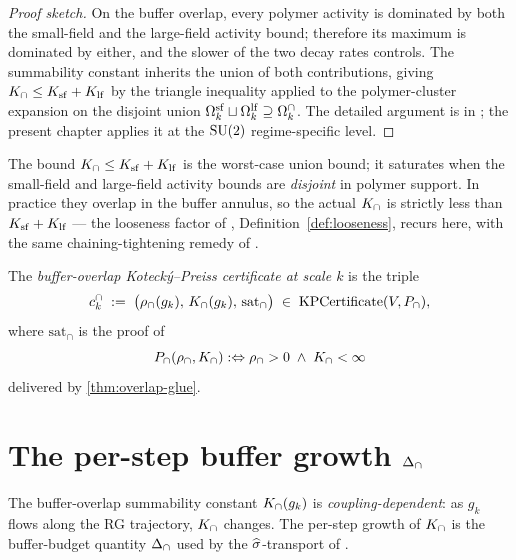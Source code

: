 \begin{proof}[Proof sketch]
On the buffer overlap, every polymer activity is dominated by both
the small-field and the large-field activity bound; therefore its
maximum is dominated by either, and the slower of the two decay
rates controls.  The summability constant inherits the union of
both contributions, giving $K_{\cap} \le K_{\mathrm{sf}} + K_{\mathrm{lf}}$ by the triangle
inequality applied to the polymer-cluster expansion on the
disjoint union $\Omega_k^{\mathrm{sf}} \sqcup \Omega_k^{\mathrm{lf}} \supseteq \Omega_k^{\cap}$.  The
detailed argument is in ; the present
chapter applies it at the $\mathrm{SU}(2)$ regime-specific level.
\end{proof}

\begin{remark}
\label{rem:K-cap-saturation}
The bound $K_{\cap} \le K_{\mathrm{sf}} + K_{\mathrm{lf}}$ is the worst-case union bound; it
saturates when the small-field and large-field activity bounds are
\emph{disjoint} in polymer support.  In practice they overlap in
the buffer annulus, so the actual $K_{\cap}$ is strictly less than
$K_{\mathrm{sf}} + K_{\mathrm{lf}}$ — the looseness factor of
, Definition~\ref{def:looseness}, recurs
here, with the same chaining-tightening remedy of
.
\end{remark}

\begin{definition}
\label{def:overlap-certificate}
The \emph{buffer-overlap Kotecký--Preiss certificate at scale $k$}
is the triple
\begin{equation}
  \label{eq:cap-certificate}
  c_k^{\cap} \;:=\;
  \bigl(\rho_{\cap}(g_k),\, K_{\cap}(g_k),\, \mathrm{sat}_{\cap}\bigr)
  \;\in\; \mathrm{KPCertificate}(V, P_{\cap}),
\end{equation}
where $\mathrm{sat}_{\cap}$ is the proof of
\[
  P_{\cap}(\rho_{\cap}, K_{\cap}) :\Leftrightarrow
  \rho_{\cap} > 0 \;\wedge\; K_{\cap} < \infty
\]
delivered by \cref{thm:overlap-glue}.
\end{definition}

\section{The per-step buffer growth
  \texorpdfstring{$\Delta_{\cap}$}{Delta\_cap}}
\label{sec:delta-cap}

%

The buffer-overlap summability constant $K_{\cap}(g_k)$ is
\emph{coupling-dependent}: as $g_k$ flows along the RG trajectory,
$K_{\cap}$ changes.  The per-step growth of $K_{\cap}$ is the
buffer-budget quantity $\Delta_{\cap}$ used by the $\widehat{\sigma}$-transport of
.

